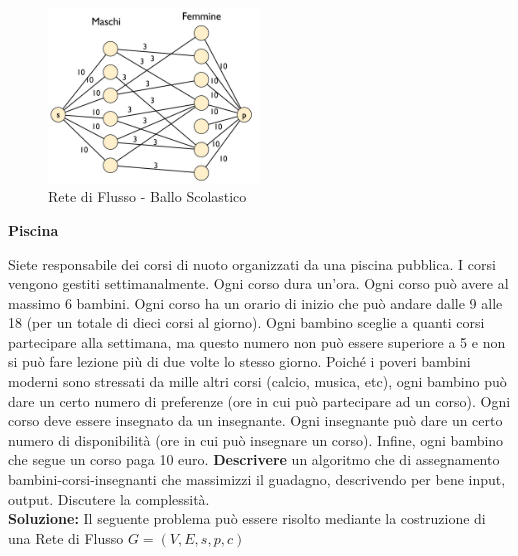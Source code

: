 \documentclass[../cheatSheetAlgoritmi.tex]{subfiles}
\begin{document}
\begin{figure}[h]
\caption{Rete di Flusso - Ballo Scolastico}
\centering
\includegraphics[width=0.5\textwidth]{../img/Locale_4.jpg}
\end{figure}
\newpage
\begin{flushleft}
\textbf{Piscina}
\end{flushleft}
Siete responsabile dei corsi di nuoto organizzati da una piscina pubblica. I corsi vengono gestiti settimanalmente. Ogni corso dura un’ora. Ogni corso può avere al massimo 6 bambini. Ogni corso ha un orario di inizio che può andare dalle 9 alle 18 (per un totale di dieci corsi al giorno). Ogni bambino sceglie a quanti corsi partecipare alla settimana, ma questo numero non può essere superiore a 5 e non si può fare lezione più di due volte lo stesso giorno. Poiché i poveri bambini moderni sono stressati da mille altri corsi (calcio, musica, etc), ogni bambino può dare un certo numero di preferenze (ore in cui può partecipare ad un corso). Ogni corso deve essere insegnato da un insegnante. Ogni insegnante può dare un certo numero di disponibilità (ore in cui può insegnare un corso). Infine, ogni bambino che segue un corso paga 10 euro. \textbf{Descrivere} un algoritmo che di assegnamento bambini-corsi-insegnanti che massimizzi il guadagno, descrivendo per bene input, output. Discutere la complessità.\\
\textbf{Soluzione:} Il seguente problema può essere risolto mediante la costruzione di una Rete di Flusso $G = (V, E, s, p, c)$
\end{document}
